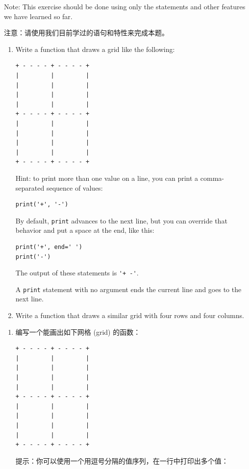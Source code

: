 \begin{exercise}

Note: This exercise should be done using only the statements and other features we have learned so far.

注意：请使用我们目前学过的语句和特性来完成本题。

\begin{enumerate}

\item Write a function that draws a grid like the following:

\begin{lstlisting}
+ - - - - + - - - - +
|         |         |
|         |         |
|         |         |
|         |         |
+ - - - - + - - - - +
|         |         |
|         |         |
|         |         |
|         |         |
+ - - - - + - - - - +
\end{lstlisting}
%
Hint: to print more than one value on a line, you can print
a comma-separated sequence of values:

\begin{lstlisting}
print('+', '-')
\end{lstlisting}
%
By default, {\tt print} advances to the next line, but you
can override that behavior and put a space at the end, like this:

\begin{lstlisting}
print('+', end=' ')
print('-')
\end{lstlisting}
%
The output of these statements is \verb"'+ -'".

A {\tt print} statement with no argument ends the current line and
goes to the next line.

\item Write a function that draws a similar grid
with four rows and four columns.

\end{enumerate}


\begin{enumerate}

\item 编写一个能画出如下网格 (grid) 的函数：

\begin{lstlisting}
+ - - - - + - - - - +
|         |         |
|         |         |
|         |         |
|         |         |
+ - - - - + - - - - +
|         |         |
|         |         |
|         |         |
|         |         |
+ - - - - + - - - - +
\end{lstlisting}
%
提示：你可以使用一个用逗号分隔的值序列，在一行中打印出多个值：


\end{enumerate}
\end{exercise}

